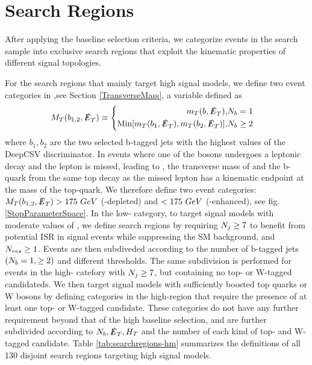 \section{Search Regions}\label{SearchRegions}

After applying the baseline selection criteria, we categorize events in the search sample into exclusive search regions that exploit the kinematic properties of different signal topologies. 

For the search regions that mainly target high \dm{} signal models, we define two event categories in \mtb,see Section \ref{TransverseMass}, a variable defined as
\begin{equation}
M_{T}(b_{1,2},\slashed{E}_{T})\equiv
\begin{cases}
\begin{split}
m_T(b,\slashed{E}_{T}), &N_{b}=1 \\
\text{Min}[m_T(b_1, \slashed{E}_{T}),m_T(b_2,\slashed{E}_{T})], &N_{b}\geq2 \\
\end{split}
\end{cases}
\end{equation}
where $b_1, b_2$ are the two selected b-tagged jets with the highest values of the DeepCSV discriminator. In \ttbar{} events where one of the \W{} bosons undergoes a leptonic decay and the lepton is missed, leading to \met{}, the transverse mass of \met{} and the b-quark from the same top decay as the missed lepton has a kinematic endpoint at the mass of the top-quark. We therefore define two event categories: $M_{T}(b_{1,2},\slashed{E}_{T})>175~GeV$ (\ttbar-depleted) and $< 175~GeV$ (\ttbar-enhanced), see fig. \ref{StopParameterSpace}. In the low-\mtb{} category, to target signal models with moderate values of \dm, we define search regions by requiring $N_{j}\geq7$ to benefit from potential ISR in signal events while suppressing the SM background, and $N_{res}\geq1$. Events are then subdiveded according to the number of b-tagged jets $(N_{b}=1,\geq2)$ and different \met{} thresholds. The same subdivision is performed for events in the high-\mtb{} catefory with $N_{j}\geq7$, but containing no top- or W-tagged candidateds. We then target signal models with sufficiently boosted top quarks or W bosons by defining categories in the high-\mtb region that require the presence of at least one top- or W-tagged candidate. These categories do not have any further \nj{} requirement beyond that of the high \dm{} baseline selection, and are further subdivided according to $N_{b}, \slashed{E}_{T}, H_{T}$ and the number of each kind of top- and W-tagged candidate. Table \ref{tab:searchregions-hm} summarizes the definitions of all 130 disjoint search regions targeting high \dm{} signal models.

